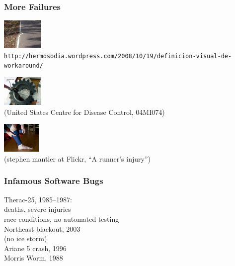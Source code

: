 \documentclass{beamer}
\newenvironment{changemargin}[1]{%
  \begin{list}{}{%
    \setlength{\topsep}{0pt}%
    \setlength{\leftmargin}{#1}%
    \setlength{\rightmargin}{1em}
    \setlength{\listparindent}{\parindent}%
    \setlength{\itemindent}{\parindent}%
    \setlength{\parsep}{\parskip}%
  }%
  \item[]}{\end{list}}
\begin{document}
\begin{frame}
  \frametitle{More Failures}




\begin{center}
\includegraphics[height=4em]{L01/workaround.jpg}\\
\tiny \tt http://hermosodia.wordpress.com/2008/10/19/definicion-visual-de-workaround/
\end{center}


\begin{center}
\includegraphics[height=4em]{L01/04MI074c.jpg}\\
\tiny (United States Centre for Disease Control, 04MI074)
\end{center}

\begin{center}
\includegraphics[height=4em]{L01/2873443918_ddc0337d19.jpg}\\
\tiny (stephen mantler at Flickr, ``A runner's injury'')
\end{center}

\end{frame}


\begin{frame}
  \frametitle{Infamous Software Bugs}
  \Large
  \begin{changemargin}{2em}
    Therac-25, 1985--1987: \\
     deaths, severe injuries\\
    \qquad race conditions, no automated testing\\[1em]
    Northeast blackout, 2003\\
    \qquad (no ice storm)\\[1em]
    Ariane 5 crash, 1996\\[1em]
    Morris Worm, 1988
    
  \end{changemargin}
\end{frame}
\end{document}

